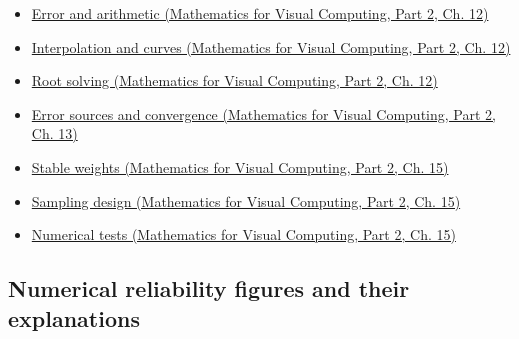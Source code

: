 \begin{itemize}
\tightlist
\item
  \href{../02-Mathematics-for-Visual-Computing-P02/main.pdf\#02-foundations-ii-ch028-floating-point-answers-error-conditioning-stability-and-stable-arithmetic}{Error and arithmetic (Mathematics for Visual Computing, Part 2, Ch. 12)}
\item
  \href{../02-Mathematics-for-Visual-Computing-P02/main.pdf\#02-foundations-ii-ch028-reconstructing-values-and-curves-between-samples}{Interpolation and curves (Mathematics for Visual Computing, Part 2, Ch. 12)}
\item
  \href{../02-Mathematics-for-Visual-Computing-P02/main.pdf\#02-foundations-ii-ch028-finding-roots-with-guarantees-and-convergence-checks}{Root solving (Mathematics for Visual Computing, Part 2, Ch. 12)}
\item
  \href{../02-Mathematics-for-Visual-Computing-P02/main.pdf\#02-foundations-ii-ch029-separate-discretization-truncation-and-roundoff-measure-convergence}{Error sources and convergence (Mathematics for Visual Computing, Part 2, Ch. 13)}
\item
  \href{../02-Mathematics-for-Visual-Computing-P02/main.pdf\#02-foundations-ii-ch031-keep-probability-weights-stable-before-sampling}{Stable weights (Mathematics for Visual Computing, Part 2, Ch. 15)}
\item
  \href{../02-Mathematics-for-Visual-Computing-P02/main.pdf\#02-foundations-ii-ch031-design-samples-without-replacement-stratified-and-low-discrepancy}{Sampling design (Mathematics for Visual Computing, Part 2, Ch. 15)}
\item
  \href{../02-Mathematics-for-Visual-Computing-P02/main.pdf\#02-foundations-ii-ch031-test-numerical-methods-and-benchmark-reproducibly}{Numerical tests (Mathematics for Visual Computing, Part 2, Ch. 15)}
\end{itemize}

\subsection{Numerical reliability figures and their explanations}\label{appendix-cb5af353ef77-numerical-reliability-figures-and-their-explanations}

\hypertarget{appendix-cb5af353ef77-numerical-reliability-figures-and-their-explanations}{}

